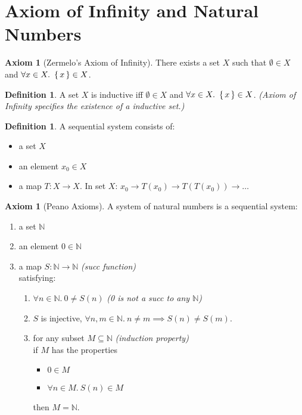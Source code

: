 \documentclass[12pt]{article}
\newcounter{dummy} \numberwithin{dummy}{section}
\theoremstyle{definition}
\newtheorem{axiom}[dummy]{Axiom}
\newtheorem{defn}[dummy]{Definition}
\newcommand{\nat}{\mathbb{N}}
\begin{document}
\setcounter{section}{12}
\section{Axiom of Infinity and Natural Numbers}
\begin{axiom}[Zermelo's Axiom of Infinity]
     There exists a set $X$ such that $\emptyset \in X$ and $\forall x \in X.~ \set{x} \in X$.
\end{axiom}
\begin{defn} \label{defn:inductive}
    A set $X$ is inductive iff $\emptyset \in X$ and $\forall x\in X.~ \set{x} \in X$. \emph{(Axiom of Infinity specifies the existence of a inductive set.)}
\end{defn}
\begin{defn}
    A sequential system consists of:
    \begin{itemize}
        \item a set $X$
        \item an element $x_0 \in X$
        \item a map $T:X\to X$. In set $X$: $x_0 \rightarrow T(x_0) \rightarrow T(T(x_0)) \rightarrow \dots$
    \end{itemize}
\end{defn}
\begin{axiom}[Peano Axioms]    \label{axiom:peano}
    A system of natural numbers is a sequential system:
    \begin{enumerate}
        \item a set $\nat$
        \item an element $0 \in \nat$
        \item a map $S:\nat \to \nat$ \emph{(succ function)}\\
            satisfying:
        \begin{enumerate}[label=(\roman*)]
            \item $\forall n \in \nat.~ 0 \neq S(n)$        \hfill \emph{(0 is not a succ to any $\nat$)}
            \item $S$ is injective, $\forall n,m \in \nat.~ n \neq m \implies S(n) \neq S(m)$.
            \item for any subset $M \subseteq \nat$         \hfill \emph{(induction property)}\\
                if $M$ has the properties
                \begin{itemize}
                    \item $0 \in M$
                    \item $\forall n \in M.~ S(n) \in M$
                \end{itemize}
                then $M = \nat$.
        \end{enumerate}
    \end{enumerate}
\end{axiom}
\end{document}
